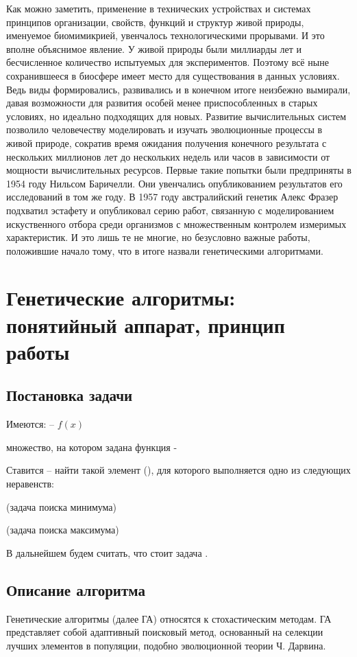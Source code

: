 Как можно заметить, применение в технических устройствах и системах принципов организации, свойств, функций и структур живой природы, именуемое биомимикрией, увенчалось технологическими прорывами. И это вполне объяснимое явление. У живой природы были миллиарды лет и бесчисленное количество испытуемых для экспериментов. Поэтому всё ныне сохранившееся в биосфере имеет место для существования в данных условиях. Ведь виды формировались, развивались и в конечном итоге неизбежно вымирали, давая возможности для развития особей менее приспособленных в старых условиях, но идеально подходящих для новых.
Развитие вычислительных систем позволило человечеству моделировать и изучать эволюционные процессы в живой природе, сократив время ожидания получения конечного результата с нескольких миллионов лет до нескольких недель или часов в зависимости от мощности вычислительных ресурсов. Первые такие попытки были предприняты в 1954 году Нильсом Баричелли. Они увенчались опубликованием результатов его исследований в том же году. В 1957 году австралийский генетик Алекс Фразер подхватил эстафету и опубликовал серию работ, связанную с моделированием искуственного отбора среди организмов с множественным контролем измеримых характеристик. И это лишь те не многие, но безусловно важные работы, положившие начало тому, что в итоге назвали генетическими алгоритмами.
\chapter{Генетические алгоритмы: понятийный аппарат, принцип работы}
\section{Постановка задачи}
Имеются:
 --  $f(x)$

множество, на котором задана функция - 


Ставится  -- найти такой элемент (), для которого выполняется одно из следующих неравенств:


(задача поиска минимума)

(задача поиска максимума)

В дальнейшем будем считать, что стоит задача .

\section{Описание алгоритма}
Генетические алгоритмы (далее ГА) относятся к стохастическим методам. ГА представляет собой адаптивный поисковый метод, основанный на селекции лучших элементов в популяции, подобно эволюционной теории Ч. Дарвина.

